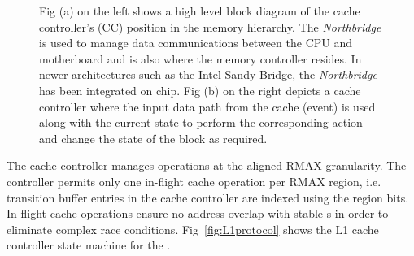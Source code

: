 \begin{figure}[h]
  \caption[Cache Controller]{Fig (a) on the left shows a high level block diagram of the cache controller's (CC) position in the memory hierarchy. The \textit{Northbridge} is used to manage data communications between the CPU and motherboard and is also where the memory controller resides. In newer architectures such as the Intel Sandy Bridge, the \textit{Northbridge} has been integrated on chip. Fig (b) on the right depicts a cache controller where the input data path from the cache (event) is used along with the current state to perform the corresponding action and change the state of the block as required.}
  \label{fig:cache_controller_basics}
\end{figure}


The cache controller manages operations at the aligned RMAX granularity. The controller permits only one in-flight cache operation per RMAX region, i.e. transition buffer entries in the cache controller are indexed using the region bits. In-flight cache operations ensure no address overlap with stable \AB{}s in order to eliminate complex race conditions. Fig~\ref{fig:L1protocol} shows the L1 cache controller state machine for the \AC{}. 

